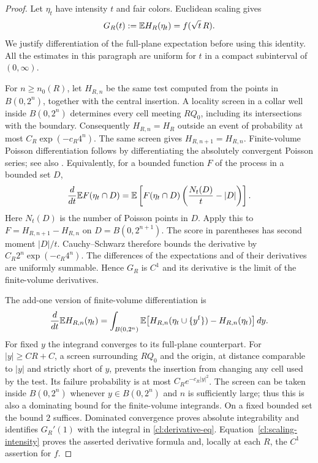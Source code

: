 \begin{proof}
Let $\eta_t$ have intensity $t$ and fair colors. Euclidean scaling gives
\begin{equation}\label{cl:scaling-intensity}
 G_R(t):=\mathbb E H_R(\eta_t)=f(\sqrt t\,R).
\end{equation}
We justify differentiation of the full-plane expectation before using
this identity. All the estimates in this paragraph are uniform for
$t$ in a compact subinterval of $(0,\infty)$.

For $n\ge n_0(R)$, let $H_{R,n}$ be the same test computed from the
points in $B(0,2^n)$, together with the central insertion. A locality
screen in a collar well inside $B(0,2^n)$ determines every cell meeting
$RQ_0$, including its intersections with the boundary. Consequently
$H_{R,n}=H_R$ outside an event of probability at most
$C_R\exp(-c_R4^n)$. The same screen gives
$H_{R,n+1}=H_{R,n}$. Finite-volume Poisson differentiation follows by
differentiating the absolutely convergent Poisson series; see also
\cite[Theorem~19.1]{LP}. Equivalently,
for a bounded function $F$ of the process in a bounded set $D$,
\begin{equation}\label{cl:poisson-score}
 \frac{d}{dt}\mathbb E F(\eta_t\cap D)
 =\mathbb E\left[F(\eta_t\cap D)
       \left(\frac{N_t(D)}t-|D|\right)\right].
\end{equation}
Here $N_t(D)$ is the number of Poisson points in $D$.
Apply this to $F=H_{R,n+1}-H_{R,n}$ on $D=B(0,2^{n+1})$.
The score in parentheses has second moment $|D|/t$. Cauchy--Schwarz
therefore bounds the derivative by
$C_R2^n\exp(-c_R4^n)$. The differences of the expectations and of
their derivatives are uniformly summable. Hence $G_R$ is $C^1$ and
its derivative is the limit of the finite-volume derivatives.

The add-one version of finite-volume differentiation is
\[
 \frac{d}{dt}\mathbb E H_{R,n}(\eta_t)
 =\int_{B(0,2^n)}
  \mathbb E\bigl[H_{R,n}(\eta_t\cup\{y^{\rm f}\})
                     -H_{R,n}(\eta_t)\bigr]\,dy.
\]
For fixed $y$ the integrand converges to its full-plane counterpart.
For $|y|\ge C R+C$, a screen surrounding $RQ_0$ and the origin, at
distance comparable to $|y|$ and strictly short of $y$, prevents the
insertion from changing any cell used by the test. Its failure
probability is at most $C_R e^{-c_R|y|^2}$. The screen can be taken
inside $B(0,2^n)$ whenever $y\in B(0,2^n)$ and $n$ is sufficiently
large; thus this is also a dominating bound for the finite-volume
integrands. On a fixed bounded set the bound $2$ suffices.
Dominated convergence proves absolute integrability and identifies
$G_R'(1)$ with the integral in \eqref{cl:derivative-eq}.
Equation~\eqref{cl:scaling-intensity} proves the asserted derivative
formula and, locally at each $R$, the $C^1$ assertion for $f$.
\end{proof}

